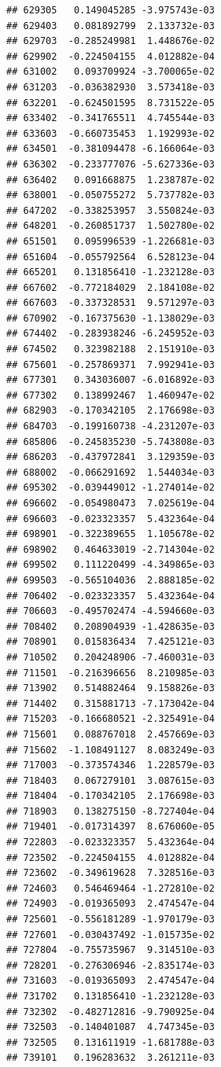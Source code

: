 \begin{frame}[fragile]
\begin{verbatim}
## 629305   0.149045285 -3.975743e-03
## 629403   0.081892799  2.133732e-03
## 629703  -0.285249981  1.448676e-02
## 629902  -0.224504155  4.012882e-04
## 631002   0.093709924 -3.700065e-02
## 631203  -0.036382930  3.573418e-03
## 632201  -0.624501595  8.731522e-05
## 633402  -0.341765511  4.745544e-03
## 633603  -0.660735453  1.192993e-02
## 634501  -0.381094478 -6.166064e-03
## 636302  -0.233777076 -5.627336e-03
## 636402   0.091668875  1.238787e-02
## 638001  -0.050755272  5.737782e-03
## 647202  -0.338253957  3.550824e-03
## 648201  -0.260851737  1.502780e-02
## 651501   0.095996539 -1.226681e-03
## 651604  -0.055792564  6.528123e-04
## 665201   0.131856410 -1.232128e-03
## 667602  -0.772184029  2.184108e-02
## 667603  -0.337328531  9.571297e-03
## 670902  -0.167375630 -1.138029e-03
## 674402  -0.283938246 -6.245952e-03
## 674502   0.323982188  2.151910e-03
## 675601  -0.257869371  7.992941e-03
## 677301   0.343036007 -6.016892e-03
## 677302   0.138992467  1.460947e-02
## 682903  -0.170342105  2.176698e-03
## 684703  -0.199160738 -4.231207e-03
## 685806  -0.245835230 -5.743808e-03
## 686203  -0.437972841  3.129359e-03
## 688002  -0.066291692  1.544034e-03
## 695302  -0.039449012 -1.274014e-02
## 696602  -0.054980473  7.025619e-04
## 696603  -0.023323357  5.432364e-04
## 698901  -0.322389655  1.105678e-02
## 698902   0.464633019 -2.714304e-02
## 699502   0.111220499 -4.349865e-03
## 699503  -0.565104036  2.888185e-02
## 706402  -0.023323357  5.432364e-04
## 706603  -0.495702474 -4.594660e-03
## 708402   0.208904939 -1.428635e-03
## 708901   0.015836434  7.425121e-03
## 710502   0.204248906 -7.460031e-03
## 711501  -0.216396656  8.210985e-03
## 713902   0.514882464  9.158826e-03
## 714402   0.315881713 -7.173042e-04
## 715203  -0.166680521 -2.325491e-04
## 715601   0.088767018  2.457669e-03
## 715602  -1.108491127  8.083249e-03
## 717003  -0.373574346  1.228579e-03
## 718403   0.067279101  3.087615e-03
## 718404  -0.170342105  2.176698e-03
## 718903   0.138275150 -8.727404e-04
## 719401  -0.017314397  8.676060e-05
## 722803  -0.023323357  5.432364e-04
## 723502  -0.224504155  4.012882e-04
## 723602  -0.349619628  7.328516e-03
## 724603   0.546469464 -1.272810e-02
## 724903  -0.019365093  2.474547e-04
## 725601  -0.556181289 -1.970179e-03
## 727601  -0.030437492 -1.015735e-02
## 727804  -0.755735967  9.314510e-03
## 728201  -0.276306946 -2.835174e-03
## 731603  -0.019365093  2.474547e-04
## 731702   0.131856410 -1.232128e-03
## 732302  -0.482712816 -9.790925e-04
## 732503  -0.140401087  4.747345e-03
## 732505   0.131611919 -1.681788e-03
## 739101   0.196283632  3.261211e-03

\end{verbatim}
\end{frame}
